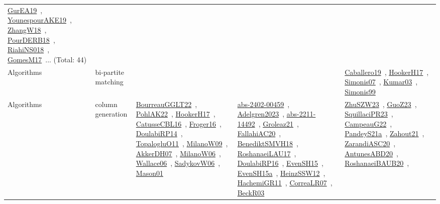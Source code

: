 {\begin{longtable}{lp{3cm}>{\raggedright\arraybackslash}p{6cm}>{\raggedright\arraybackslash}p{6cm}>{\raggedright\arraybackslash}p{8cm}}
\href{../works/GurEA19.pdf}{GurEA19}~\cite{GurEA19}, \href{../works/YounespourAKE19.pdf}{YounespourAKE19}~\cite{YounespourAKE19}, \href{../works/ZhangW18.pdf}{ZhangW18}~\cite{ZhangW18}, \href{../works/PourDERB18.pdf}{PourDERB18}~\cite{PourDERB18}, \href{../works/RiahiNS018.pdf}{RiahiNS018}~\cite{RiahiNS018}, \href{../works/GomesM17.pdf}{GomesM17}~\cite{GomesM17}... (Total: 44)\\
Algorithms & bi-partite matching &  &  & \href{../works/Caballero19.pdf}{Caballero19}~\cite{Caballero19}, \href{../works/HookerH17.pdf}{HookerH17}~\cite{HookerH17}, \href{../works/Simonis07.pdf}{Simonis07}~\cite{Simonis07}, \href{../works/Kumar03.pdf}{Kumar03}~\cite{Kumar03}, \href{../works/Simonis99.pdf}{Simonis99}~\cite{Simonis99}\\
Algorithms & column generation & \href{../works/BourreauGGLT22.pdf}{BourreauGGLT22}~\cite{BourreauGGLT22}, \href{../works/PohlAK22.pdf}{PohlAK22}~\cite{PohlAK22}, \href{../works/HookerH17.pdf}{HookerH17}~\cite{HookerH17}, \href{../works/CatusseCBL16.pdf}{CatusseCBL16}~\cite{CatusseCBL16}, \href{../works/Froger16.pdf}{Froger16}~\cite{Froger16}, \href{../works/DoulabiRP14.pdf}{DoulabiRP14}~\cite{DoulabiRP14}, \href{../works/TopalogluO11.pdf}{TopalogluO11}~\cite{TopalogluO11}, \href{../works/MilanoW09.pdf}{MilanoW09}~\cite{MilanoW09}, \href{../works/AkkerDH07.pdf}{AkkerDH07}~\cite{AkkerDH07}, \href{../works/MilanoW06.pdf}{MilanoW06}~\cite{MilanoW06}, \href{../works/Wallace06.pdf}{Wallace06}~\cite{Wallace06}, \href{../works/SadykovW06.pdf}{SadykovW06}~\cite{SadykovW06}, \href{../works/Mason01.pdf}{Mason01}~\cite{Mason01} & \href{../works/abs-2402-00459.pdf}{abs-2402-00459}~\cite{abs-2402-00459}, \href{../works/Adelgren2023.pdf}{Adelgren2023}~\cite{Adelgren2023}, \href{../works/abs-2211-14492.pdf}{abs-2211-14492}~\cite{abs-2211-14492}, \href{../works/Groleaz21.pdf}{Groleaz21}~\cite{Groleaz21}, \href{../works/FallahiAC20.pdf}{FallahiAC20}~\cite{FallahiAC20}, \href{../works/BenediktSMVH18.pdf}{BenediktSMVH18}~\cite{BenediktSMVH18}, \href{../works/RoshanaeiLAU17.pdf}{RoshanaeiLAU17}~\cite{RoshanaeiLAU17}, \href{../works/DoulabiRP16.pdf}{DoulabiRP16}~\cite{DoulabiRP16}, \href{../works/EvenSH15.pdf}{EvenSH15}~\cite{EvenSH15}, \href{../works/EvenSH15a.pdf}{EvenSH15a}~\cite{EvenSH15a}, \href{../works/HeinzSSW12.pdf}{HeinzSSW12}~\cite{HeinzSSW12}, \href{../works/HachemiGR11.pdf}{HachemiGR11}~\cite{HachemiGR11}, \href{../works/CorreaLR07.pdf}{CorreaLR07}~\cite{CorreaLR07}, \href{../works/BeckR03.pdf}{BeckR03}~\cite{BeckR03} & \href{../works/ZhuSZW23.pdf}{ZhuSZW23}~\cite{ZhuSZW23}, \href{../works/GuoZ23.pdf}{GuoZ23}~\cite{GuoZ23}, \href{../works/SquillaciPR23.pdf}{SquillaciPR23}~\cite{SquillaciPR23}, \href{../works/CampeauG22.pdf}{CampeauG22}~\cite{CampeauG22}, \href{../works/PandeyS21a.pdf}{PandeyS21a}~\cite{PandeyS21a}, \href{../works/Zahout21.pdf}{Zahout21}~\cite{Zahout21}, \href{../works/ZarandiASC20.pdf}{ZarandiASC20}~\cite{ZarandiASC20}, \href{../works/AntunesABD20.pdf}{AntunesABD20}~\cite{AntunesABD20}, \href{../works/RoshanaeiBAUB20.pdf}{RoshanaeiBAUB20}~\cite{RoshanaeiBAUB20}, 
\end{longtable}}
